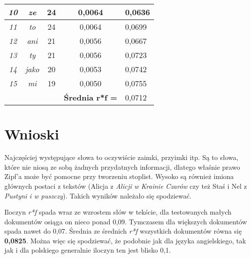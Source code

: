 \documentclass[a4paper]{article}
\begin{document}
\begin{table}
\begin{tabular}{ccc|c|l|}
\multicolumn{1}{|c|}{\textit{10}}                & \multicolumn{1}{c|}{\textit{ze}}    & 24                                & 0,0064                                     & 0,0636 \\ \hline
\multicolumn{1}{|c|}{\textit{11}}                & \multicolumn{1}{c|}{\textit{to}}    & 24                                & 0,0064                                     & 0,0699 \\ \hline
\multicolumn{1}{|c|}{\textit{12}}                & \multicolumn{1}{c|}{\textit{ani}}   & 21                                & 0,0056                                     & 0,0667 \\ \hline
\multicolumn{1}{|c|}{\textit{13}}                & \multicolumn{1}{c|}{\textit{ty}}    & 21                                & 0,0056                                     & 0,0723 \\ \hline
\multicolumn{1}{|c|}{\textit{14}}                & \multicolumn{1}{c|}{\textit{jako}}  & 20                                & 0,0053                                     & 0,0742 \\ \hline
\multicolumn{1}{|c|}{\textit{15}}                & \multicolumn{1}{c|}{\textit{mi}}    & 19                                & 0,0050                                     & 0,0755 \\ \hline
\multicolumn{1}{l}{}                             &                                     &                                   & \textbf{Średnia r*f =}                     & 0,0712 \\ \cline{4-5} 
\end{tabular}
\end{table}





\section{Wnioski}
\hspace{1cm} Najczęściej występujące słowa to oczywiście zaimki, przyimki itp. Są to słowa, które nie niosą ze sobą żadnych przydatnych informacji, dlatego właśnie prawo Zipf'a może być pomocne przy tworzeniu stoplist. Wysoko są również imiona głównych postaci z tekstów (Alicja z \textit{Alicji w Krainie Czarów} czy też Staś i Nel z \textit{Pustyni i w puszczy}). Takich wyników należało się spodziewać. 

\hspace{1cm}Iloczyn \textit{r*f} spada wraz ze wzrostem słów w tekście, dla testowanych małych dokumentów osiąga on nieco ponad 0,09. Tymczasem dla większych dokumentów spada nawet do 0,07. Średnia ze średnich \textit{r*f} wszystkich dokumentów równa się \textbf{0,0825}. Można więc się spodziewać, że podobnie jak dla języka angielskiego, tak jak i dla polskiego generalnie iloczyn ten jest blisko 0,1.
\end{document}
